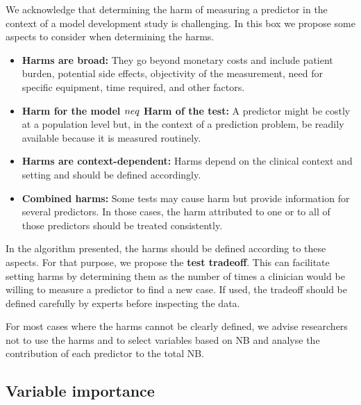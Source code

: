 \begin{tcolorbox}[title={Box 2: Harm of a test and test tradeoff}, label={box:harm}]
We acknowledge that determining the harm of measuring a predictor in the context of a model development study is challenging. In this box we propose some aspects to consider when determining the harms.

\begin{itemize}
    \item \textbf{Harms are broad:} They go beyond monetary costs and include patient burden, potential side effects, objectivity of the measurement, need for specific equipment, time required, and other factors.
    \item \textbf{Harm for the model $\\neq$ Harm of the test:} A predictor might be costly at a population level but, in the context of a prediction problem, be readily available because it is measured routinely.
    \item \textbf{Harms are context-dependent:} Harms depend on the clinical context and setting and should be defined accordingly.
    \item \textbf{Combined harms:} Some tests may cause harm but provide information for several predictors. In those cases, the harm attributed to one or to all of those predictors should be treated consistently.
\end{itemize}

In the algorithm presented, the harms should be defined according to these aspects. For that purpose, we propose the \textbf{test tradeoff}. This can facilitate setting harms by determining them as the number of times a clinician would be willing to measure a predictor to find a new case. If used, the tradeoff should be defined carefully by experts before inspecting the data.

For most cases where the harms cannot be clearly defined, we advise researchers not to use the harms and to select variables based on \gls{NB} and analyse the contribution of each predictor to the total \gls{NB}.
\end{tcolorbox}

\subsection{Variable importance}

